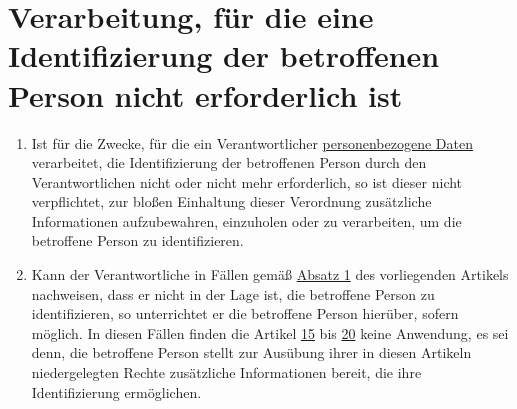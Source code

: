 \chapter{Verarbeitung, für die eine Identifizierung der betroffenen Person nicht erforderlich ist}
\label{ch:11}


\begin{enumerate}

  \item Ist für die Zwecke, für die ein Verantwortlicher \hyperref[itm:04-1]{personenbezogene Daten} verarbeitet, die Identifizierung der
   betroffenen Person durch den Verantwortlichen nicht oder nicht mehr erforderlich, so ist dieser nicht verpflichtet,
   zur bloßen Einhaltung dieser Verordnung zusätzliche Informationen aufzubewahren, einzuholen oder zu verarbeiten, um
   die betroffene Person zu identifizieren.
  \label{itm:11-1}

  \item Kann der Verantwortliche in Fällen gemäß \hyperref[itm:11-1]{Absatz 1} des vorliegenden Artikels nachweisen,
   dass er nicht in der Lage ist, die betroffene Person zu identifizieren, so unterrichtet er die betroffene Person
   hierüber, sofern möglich. In diesen Fällen finden die Artikel \hyperref[ch:15]{15} bis \hyperref[ch:20]{20} keine
   Anwendung, es sei denn, die betroffene Person stellt zur Ausübung ihrer in diesen Artikeln niedergelegten Rechte
   zusätzliche Informationen bereit, die ihre Identifizierung ermöglichen.
  \label{itm:11-2}

\end{enumerate}


